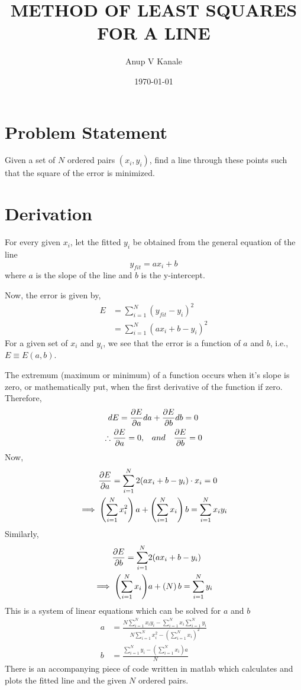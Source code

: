 \documentclass[11pt, oneside]{article}   	%
\title{\vspace{-6ex}\Large METHOD OF LEAST SQUARES FOR A LINE}
\author{\vspace{-6ex}Anup V Kanale}
\date{\vspace{-3ex}\today}							%
\begin{document}
\maketitle
\section*{Problem Statement}
Given a set of $N$ ordered pairs $(x_i, y_i)$, find a line through these points such that the square of the error is minimized.
\section*{Derivation}
For every given $x_i$, let the fitted $y_i$ be obtained from the general equation of the line
	\begin{equation}
	y_{fit} = a x_i + b
	\end{equation}
where $a$ is the slope of the line and $b$ is the y-intercept.

Now, the error is given by,
	\begin{align}
	E &= \sum\limits_{i=1}^N (y_{fit} - y_i)^2 \\
	  &= \sum\limits_{i=1}^N (a x_i + b - y_i)^2
	\end{align}
For a given set of $x_i$ and $y_i$, we see that the error is a function of $a$ and $b$, i.e., $E \equiv E(a,b)$.

The extremum (maximum or minimum) of a function occurs when it's slope is zero, or mathematically put, when the first derivative of the function if zero. Therefore,
	\begin{align}
	dE = \pdv{E}{a} da &+ \pdv{E}{b} db = 0 \\
	\therefore \pdv{E}{a} = 0, \quad &and \quad \pdv{E}{b} = 0
	\end{align}
Now,
	\begin{align}
	\pdv{E}{a} = \sum\limits_{i=1}^N 2 & (a x_i + b - y_i) \cdot x_i = 0\\
	\implies \left( \sum\limits_{i=1}^N x_i^2 \right) a &+ \left( \sum\limits_{i=1}^N x_i \right) b = \sum\limits_{i=1}^N x_i y_i
	\end{align}
Similarly,
	\begin{align}
	\pdv{E}{b} = \sum\limits_{i=1}^N & 2(a x_i + b - y_i) \\
	 \implies \left( \sum\limits_{i=1}^N x_i \right) & a + \left( N \right) b = \sum\limits_{i=1}^N y_i
	\end{align}
This is a system of linear equations which can be solved for $a$ and $b$
	\begin{align}
	a &= \frac{N \sum\limits_{i=1}^N x_i y_i - \sum\limits_{i=1}^Nx_i \sum\limits_{i=1}^N y_i}{N \sum\limits_{i=1}^N x_i^2 - \left( \sum\limits_{i=1}^Nx_i \right)^2} \\
	b &= \frac{\sum\limits_{i=1}^N y_i - \left( \sum\limits_{i=1}^N x_i \right) a}{N}
	\end{align}
There is an accompanying piece of code written in matlab which calculates and plots the fitted line and the given $N$ ordered pairs.
\end{document}
